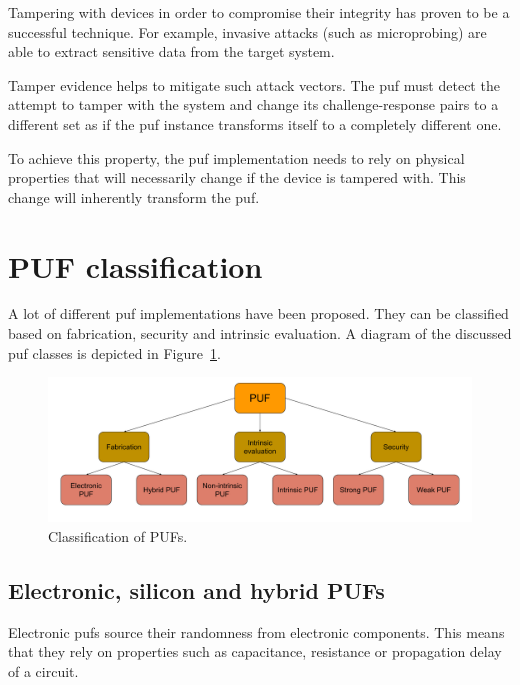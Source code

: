 Tampering with devices in order to compromise their integrity has proven to be a successful technique. For example, invasive attacks (such as microprobing) are able to extract sensitive data from the target system.\cite{Kommerling1999}

Tamper evidence helps to mitigate such attack vectors. The \gls{puf} must detect the attempt to tamper with the system and change its challenge-response pairs to a different set as if the \gls{puf} instance transforms itself to a completely different one.

To achieve this property, the \gls{puf} implementation needs to rely on physical properties that will necessarily change if the device is tampered with. This change will inherently transform the \gls{puf}.

\section{PUF classification}

A lot of different \gls{puf} implementations have been proposed. They can be classified based on fabrication, security and intrinsic evaluation\cite{Shital2017}\cite{McGrath2019}. A diagram of the discussed \gls{puf} classes is depicted in Figure~\ref{fig:classification}.

\begin{figure}[ht!]
    \centering
    \captionsetup{justification=centering,margin=0.5cm}
    \includegraphics[width=\textwidth]{images/classification}
    \caption{Classification of PUFs.}
    \label{fig:classification}
\end{figure}

\subsection{Electronic, silicon and hybrid PUFs}

Electronic \glspl{puf} source their randomness from electronic components. This means that they rely on properties such as capacitance, resistance or propagation delay of a circuit.

